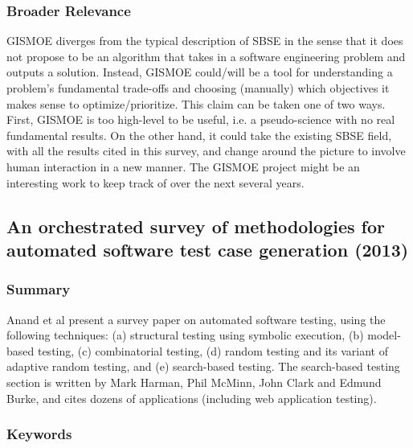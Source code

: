 \documentclass{sig-alternate-05-2015}
\begin{document}
\subsubsection{Broader Relevance}
GISMOE diverges from the typical description of SBSE in the sense that it does not propose to be an algorithm that takes in a software engineering problem and outputs a solution. Instead, GISMOE could/will be a tool for understanding a problem's fundamental trade-offs and choosing (manually) which objectives it makes sense to optimize/prioritize. This claim can be taken one of two ways. First, GISMOE is too high-level to be useful, i.e. a pseudo-science with no real fundamental results. On the other hand, it could take the existing SBSE field, with all the results cited in this survey, and change around the picture to involve human interaction in a new manner. The GISMOE project might be an interesting work to keep track of over the next several years.

\subsection{An orchestrated survey of methodologies for automated software test case generation (2013)}

\subsubsection{Summary}
Anand et al \cite{anand2013orchestrated} present a survey paper on automated software testing, using the following techniques: (a) structural testing using symbolic execution, (b) model-based testing, (c) combinatorial testing, (d) random testing and its variant of adaptive random testing, and (e) search-based testing. The search-based testing section is written by Mark Harman, Phil McMinn, John Clark and Edmund Burke, and cites dozens of applications (including web application testing). 

\subsubsection{Keywords}
\end{document}
